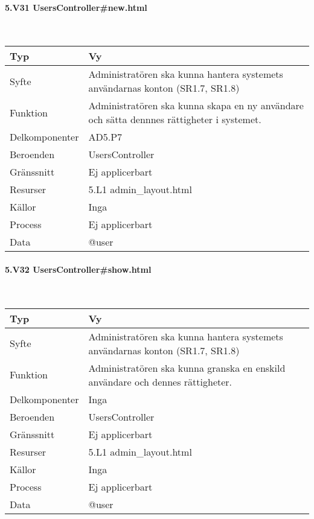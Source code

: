 \documentclass[a4paper, twoside, 11pt, titlepage]{article}
\begin{document}
			\paragraph{5.V31 UsersController\#new.html}\

			\begin {table} [ht] \begin{tabular} {  p{3.5cm} p{9.6cm} }
				\hline
				Typ & Vy  \\
				\hline
				Syfte & Administratören ska kunna hantera systemets användarnas konton (SR1.7, SR1.8)  \\
				\hline
				Funktion & Administratören ska kunna skapa en ny användare och sätta dennnes rättigheter i systemet.  \\
				\hline
				Delkomponenter & AD5.P7  \\
				\hline
				Beroenden & UsersController  \\
				\hline
				Gränssnitt & Ej applicerbart  \\
				\hline
				Resurser & 5.L1 admin\_layout.html  \\
				\hline
				Källor & Inga  \\
				\hline
				Process & Ej applicerbart  \\
				\hline
				Data & @user  \\
				\hline
			\end{tabular} \end{table} \FloatBarrier


			\paragraph{5.V32 UsersController\#show.html}\

			\begin {table} [ht] \begin{tabular} {  p{3.5cm} p{9.6cm} }
				\hline
				Typ & Vy  \\
				\hline
				Syfte & Administratören ska kunna hantera systemets användarnas konton (SR1.7, SR1.8)  \\
				\hline
				Funktion & Administratören ska kunna granska en enskild användare och dennes rättigheter.  \\
				\hline
				Delkomponenter & Inga  \\
				\hline
				Beroenden & UsersController  \\
				\hline
				Gränssnitt & Ej applicerbart  \\
				\hline
				Resurser & 5.L1 admin\_layout.html  \\
				\hline
				Källor & Inga  \\
				\hline
				Process & Ej applicerbart  \\
				\hline
				Data & @user  \\
				\hline
			\end{tabular} \end{table} \FloatBarrier
\end{document}
